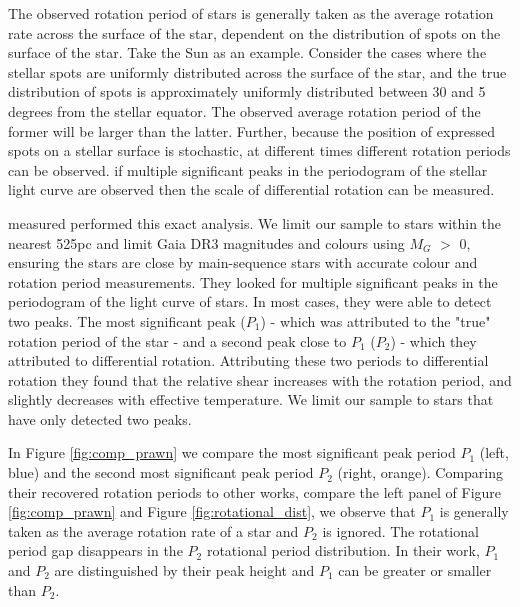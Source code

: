 The observed rotation period of stars is generally taken as the average rotation rate across the surface of the star, dependent on the distribution of spots on the surface of the star.
Take the Sun as an example.
Consider the cases where the stellar spots are uniformly distributed across the surface of the star, and the true distribution of spots is approximately uniformly distributed between 30 and 5 degrees from the stellar equator.
The observed average rotation period of the former will be larger than the latter.
Further, because the position of expressed spots on a stellar surface is stochastic, at different times different rotation periods can be observed.
if multiple significant peaks in the periodogram of the stellar light curve are observed then the scale of differential rotation can be measured.

\citet{reinhold_rotation_2013} measured performed this exact analysis.
We limit our sample to stars within the nearest 525pc and limit Gaia DR3 magnitudes and colours using $M_G$ $>$ 0, ensuring the stars are close by main-sequence stars with accurate colour and rotation period measurements.
They looked for multiple significant peaks in the periodogram of the light curve of \kepler{} stars.
In most cases, they were able to detect two peaks.
The most significant peak ($P_1$) - which was attributed to the "true" rotation period of the star - and a second peak close to $P_1$ ($P_2$) - which they attributed to differential rotation.
Attributing these two periods to differential rotation they found that the relative shear increases with the rotation period, and slightly decreases with effective temperature.
We limit our sample to stars that have only detected two peaks.

In Figure \ref{fig:comp_prawn} we compare the most significant peak period $P_1$ (left, blue) and the second most significant peak period $P_2$ (right, orange).
Comparing their recovered rotation periods to other works, compare the left panel of Figure \ref{fig:comp_prawn} and Figure \ref{fig:rotational_dist}, we observe that $P_1$ is generally taken as the average rotation rate of a star and $P_2$ is ignored.
The rotational period gap disappears in the $P_2$ rotational period distribution.
In their work, $P_1$ and $P_2$ are distinguished by their peak height and $P_1$ can be greater or smaller than $P_2$.


